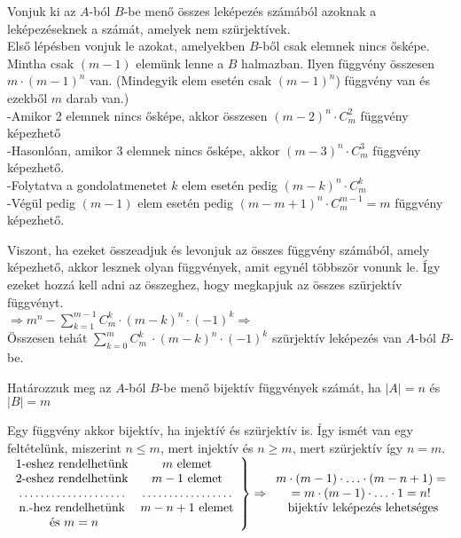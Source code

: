 \begin{solution}
	Vonjuk ki az $A$-ból $B$-be menő összes leképezés számából azoknak
	a leképezéseknek a számát, amelyek nem szürjektívek. \\
	Első lépésben vonjuk le azokat, amelyekben $B$-ből csak elemnek nincs
	ősképe. Mintha csak $(m-1)$ elemünk lenne a $B$ halmazban. Ilyen
	függvény összesen \textbf{$m\cdot(m-1)^{n}$} van. (Mindegyik elem
	esetén csak $(m-1)^{n}$) függvény van és ezekből $m$ darab van.)
	\\
	-Amikor 2 elemnek nincs ősképe, akkor összesen $(m-2)^{n}\cdot C_{m}^{2}$
	függvény képezhető \\
	-Hasonlóan, amikor 3 elemnek nincs ősképe, akkor $(m-3)^{n}\cdot C_{m}^{3}$
	függvény képezhető. \\
	-Folytatva a gondolatmenetet $k$ elem esetén pedig $(m-k)^{n}\cdot C_{m}^{k}$
	\\
	-Végül pedig $(m-1)$ elem esetén pedig $(m-m+1)^{n}\cdot C_{m}^{m-1}=m$
	függvény képezhető.
	
	Viszont, ha ezeket összeadjuk és levonjuk az összes függvény számából,
	amely képezhető, akkor lesznek olyan függvények, amit egynél többször
	vonunk le. Így ezeket hozzá kell adni az összeghez, hogy megkapjuk
	az összes szürjektív függvényt. \\
	$\Rightarrow m^{n}-{\displaystyle {\sum_{k=1}^{m-1}}C_{m}^{k}\cdot(m-k)^{n}\cdot(-1)^{k}\Rightarrow}$
	\\
	Összesen tehát ${\displaystyle {\sum_{k=0}^{m}}C_{m}^{k}\ \cdot(m-k)^{n}\cdot(-1)^{k}}$
	szürjektív leképezés van $A$-ból $B$-be. 
\end{solution}
\begin{problem}
	Határozzuk meg az $A$-ból $B$-be menő bijektív függvények számát,
	ha $|A|=n$ és $|B|=m$ 
\end{problem}
\begin{solution}
	Egy függvény akkor bijektív, ha injektí\'{v} és szürjektív is. Így
	ismét van egy feltételünk, miszerint $n\leq m$, mert injektív és
	$n\geq m$, mert szürjektív így $n=m$. \\
	$\begin{rcases}\begin{array}{cc}
			\text{1-eshez rendelhetünk} & m\text{ elemet}\\
			\text{2-eshez rendelhetünk} & m-1\text{ elemet}\\
			\dotfill & \dotfill\\
			\text{n.-hez rendelhetünk} & m-n+1\text{ elemet}\\
			\text{ és }m=n
	\end{array}\end{rcases}\Rightarrow\begin{array}{cc}
		m\cdot(m-1)\cdot\ldots\cdot(m-n+1)=\\
		=m\cdot(m-1)\cdot\ldots\cdot1=n!\\
		\text{ bijektív leképezés lehetséges}
	\end{array}$ 
\end{solution}

